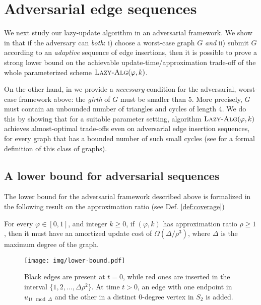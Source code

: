 \section{Adversarial edge  sequences}\label{sec:gammaok}
We next study our lazy-update algorithm in an adversarial framework. We  show  in  that if the adversary can \textit{both}: i) choose a worst-case  graph $G$ \textit{and} ii)   submit $G$ according to an \textit{adaptive} sequence of edge insertions, then it is possible to prove a strong lower bound on the achievable update-time/approximation trade-off of the whole parameterized scheme $\textsc{Lazy-Alg} (\varphi,k)$.

On the other hand, in  we provide a \textit{necessary} condition for the adversarial, worst-case framework above: the \textit{girth} \cite{diestel2024graph} of $G$ must be smaller than 5. More precisely, $G$ must contain an unbounded number of triangles and cycles of length 4. We do this by showing that for a suitable parameter setting, algorithm $\textsc{Lazy-Alg} (\varphi,k)$ achieves almost-optimal trade-offs even on adversarial edge insertion sequences, for every graph that has a bounded number of such small cycles (see  for a formal definition of this class of graphs).

\subsection{A lower bound for adversarial sequences} \label{ssec:lowerbound}
The lower bound for the adversarial framework described above is formalized in the following result on the approximation ratio (see Def. \ref{def:coverage})


\begin{theorem}\label{thm:lower}
    For every $\varphi \in [0,1]$, and integer $k \geq 0$, if  \lazyscheme$(\varphi,k)$ has approximation ratio $\rho \ge 1$, then it must have an amortized update cost  of $\Omega(\Delta/\rho^3)$, where $\Delta$ is the maximum degree of the graph.
\end{theorem}\label{le:lb1}

\begin{figure}[ht]
    \centering
    \texttt{[image: img/lower-bound.pdf]}
    \caption{Black edges are present at $t = 0$, while red ones are inserted in the interval $\{1, 2,\ldots , \Delta \rho^2\}$. At time $t > 0$, an edge with one endpoint in $u_{1t\mod\Delta}$ and the other in a distinct 0-degree vertex in $S_2$ is added.}
    \label{fig:lb1}
\end{figure}

